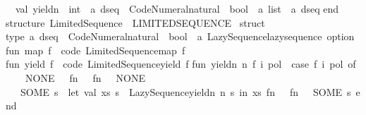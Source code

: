 \begin{isabellebody}
\ \ val\ yieldn\ {\isacharcolon}{\kern0pt}\ int\ {\isacharminus}{\kern0pt}{\isachargreater}{\kern0pt}\ {\isacharprime}{\kern0pt}a\ dseq\ {\isacharminus}{\kern0pt}{\isachargreater}{\kern0pt}\ Code{\isacharunderscore}{\kern0pt}Numeral{\isachardot}{\kern0pt}natural\ {\isacharminus}{\kern0pt}{\isachargreater}{\kern0pt}\ bool\ {\isacharminus}{\kern0pt}{\isachargreater}{\kern0pt}\ {\isacharprime}{\kern0pt}a\ list\ {\isacharasterisk}{\kern0pt}\ {\isacharprime}{\kern0pt}a\ dseq\isanewline
end{\isacharsemicolon}{\kern0pt}\isanewline
\isanewline
structure\ Limited{\isacharunderscore}{\kern0pt}Sequence\ {\isacharcolon}{\kern0pt}\ LIMITED{\isacharunderscore}{\kern0pt}SEQUENCE\ {\isacharequal}{\kern0pt}\isanewline
struct\isanewline
\isanewline
type\ {\isacharprime}{\kern0pt}a\ dseq\ {\isacharequal}{\kern0pt}\ Code{\isacharunderscore}{\kern0pt}Numeral{\isachardot}{\kern0pt}natural\ {\isacharminus}{\kern0pt}{\isachargreater}{\kern0pt}\ bool\ {\isacharminus}{\kern0pt}{\isachargreater}{\kern0pt}\ {\isacharprime}{\kern0pt}a\ Lazy{\isacharunderscore}{\kern0pt}Sequence{\isachardot}{\kern0pt}lazy{\isacharunderscore}{\kern0pt}sequence\ option\isanewline
\isanewline
fun\ map\ f\ {\isacharequal}{\kern0pt}\ {\isacharat}{\kern0pt}{\isacharbraceleft}{\kern0pt}code\ Limited{\isacharunderscore}{\kern0pt}Sequence{\isachardot}{\kern0pt}map{\isacharbraceright}{\kern0pt}\ f{\isacharsemicolon}{\kern0pt}\isanewline
\isanewline
fun\ yield\ f\ {\isacharequal}{\kern0pt}\ {\isacharat}{\kern0pt}{\isacharbraceleft}{\kern0pt}code\ Limited{\isacharunderscore}{\kern0pt}Sequence{\isachardot}{\kern0pt}yield{\isacharbraceright}{\kern0pt}\ f{\isacharsemicolon}{\kern0pt}\isanewline
\isanewline
fun\ yieldn\ n\ f\ i\ pol\ {\isacharequal}{\kern0pt}\ {\isacharparenleft}{\kern0pt}case\ f\ i\ pol\ of\isanewline
\ \ \ \ NONE\ {\isacharequal}{\kern0pt}{\isachargreater}{\kern0pt}\ {\isacharparenleft}{\kern0pt}{\isacharbrackleft}{\kern0pt}{\isacharbrackright}{\kern0pt}{\isacharcomma}{\kern0pt}\ fn\ {\isacharunderscore}{\kern0pt}\ {\isacharequal}{\kern0pt}{\isachargreater}{\kern0pt}\ fn\ {\isacharunderscore}{\kern0pt}\ {\isacharequal}{\kern0pt}{\isachargreater}{\kern0pt}\ NONE{\isacharparenright}{\kern0pt}\isanewline
\ \ {\isacharbar}{\kern0pt}\ SOME\ s\ {\isacharequal}{\kern0pt}{\isachargreater}{\kern0pt}\ let\ val\ {\isacharparenleft}{\kern0pt}xs{\isacharcomma}{\kern0pt}\ s{\isacharprime}{\kern0pt}{\isacharparenright}{\kern0pt}\ {\isacharequal}{\kern0pt}\ Lazy{\isacharunderscore}{\kern0pt}Sequence{\isachardot}{\kern0pt}yieldn\ n\ s\ in\ {\isacharparenleft}{\kern0pt}xs{\isacharcomma}{\kern0pt}\ fn\ {\isacharunderscore}{\kern0pt}\ {\isacharequal}{\kern0pt}{\isachargreater}{\kern0pt}\ fn\ {\isacharunderscore}{\kern0pt}\ {\isacharequal}{\kern0pt}{\isachargreater}{\kern0pt}\ SOME\ s{\isacharprime}{\kern0pt}{\isacharparenright}{\kern0pt}\ end{\isacharparenright}{\kern0pt}{\isacharsemicolon}{\kern0pt}\isanewline

\end{isabellebody}
